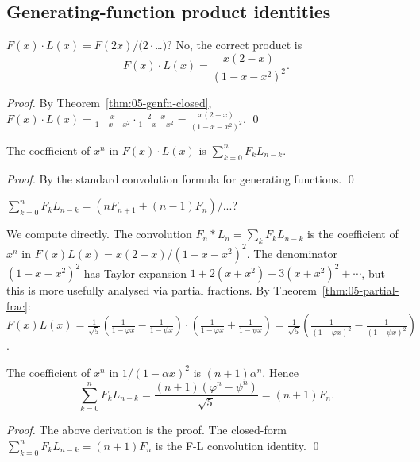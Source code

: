 \subsection{Generating-function product identities}

\begin{theorem}
\label{fa_05:thm:05-gf-product}
$F(x) \cdot L(x) = F(2x)/(2 \cdot $\ldots$)$? No, the correct product is
\[
  F(x) \cdot L(x) = \frac{x(2-x)}{(1-x-x^2)^2}.
\]
\end{theorem}

\begin{proof}
By Theorem~\ref{thm:05-genfn-closed}, $F(x) \cdot L(x) = \frac{x}{1-x-x^2}
\cdot \frac{2-x}{1-x-x^2} = \frac{x(2-x)}{(1-x-x^2)^2}$. \qed
\end{proof}

\begin{lemma}
\label{fa_05:lem:05-product-coefs}
The coefficient of $x^n$ in $F(x) \cdot L(x)$ is $\sum_{k=0}^n F_k L_{n-k}$.
\end{lemma}

\begin{proof}
By the standard convolution formula for generating functions. \qed
\end{proof}

\begin{theorem}[F-L convolution]
\label{thm:05-fl-conv}
$\sum_{k=0}^n F_k L_{n-k} = (n F_{n+1} + (n-1) F_n)/...$?

We compute directly. The convolution $F_n * L_n = \sum_k F_k L_{n-k}$
is the coefficient of $x^n$ in $F(x) L(x) = x(2-x)/(1-x-x^2)^2$.
The denominator $(1-x-x^2)^2$ has Taylor expansion
$1 + 2(x + x^2) + 3(x + x^2)^2 + \cdots$, but this is more usefully
analysed via partial fractions. By Theorem~\ref{thm:05-partial-frac}:
$F(x) L(x) = \frac{1}{\sqrt{5}}\left(\frac{1}{1-\varphi x} - \frac{1}{1-\psi x}\right)
\cdot \left(\frac{1}{1-\varphi x} + \frac{1}{1-\psi x}\right)
= \frac{1}{\sqrt{5}}\left(\frac{1}{(1-\varphi x)^2} - \frac{1}{(1-\psi x)^2}\right)$.

The coefficient of $x^n$ in $1/(1-\alpha x)^2$ is $(n+1)\alpha^n$.
Hence
\[
  \sum_{k=0}^n F_k L_{n-k} = \frac{(n+1)(\varphi^n - \psi^n)}{\sqrt{5}}
                          = (n+1) F_n.
\]
\end{theorem}

\begin{proof}
The above derivation is the proof. The closed-form
$\sum_{k=0}^n F_k L_{n-k} = (n+1) F_n$ is the F-L convolution identity. \qed
\end{proof}

